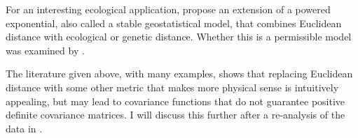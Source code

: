 \documentclass[11pt, titlepage]{article}\usepackage[]{graphicx}\usepackage[]{color}
\begin{document}
\begin{spacing}{1.9}
\begin{flushleft}
For an interesting ecological application, \citet{Brad:Ralp:Coop:dise:2013} propose an extension of a powered exponential, also called a stable geostatistical model, that combines Euclidean distance with ecological or genetic distance. Whether this is a permissible model was examined by \citet{Guil:Schi:Porc:Bevi:vali:2014}.  

The literature given above, with many examples, shows that replacing Euclidean distance with some other metric that makes more physical sense is intuitively appealing, but may lead to covariance functions that do not guarantee positive definite covariance matrices. I will discuss this further after a re-analysis of the data in \citet{Ladl:Avga:Whea:Boyc:pred:2016}.


















\end{flushleft}
\end{spacing}
\end{document}
